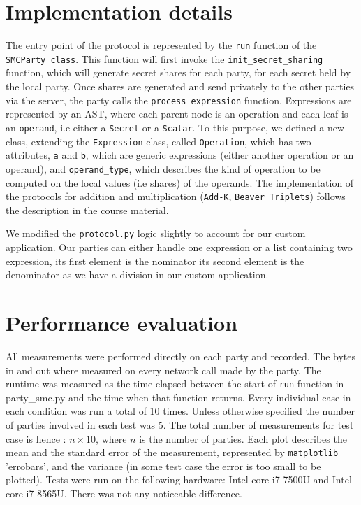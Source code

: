 \documentclass[10pt,conference,compsocconf]{IEEEtran}
\begin{document}
\section{Implementation details}
The entry point of the protocol is represented by the \texttt{run} function of the \texttt{SMCParty class}.
This function will first invoke the \texttt{init\_secret\_sharing} function, which will generate secret shares for each party, for each secret held by the local party.
Once shares are generated and send privately to the other parties via the server, the party calls the \texttt{process\_expression} function.
Expressions are represented by an AST, where each parent node is an operation and each leaf is an \texttt{operand}, i.e either a \texttt{Secret} or a \texttt{Scalar}.
To this purpose, we defined a new class, extending the \texttt{Expression} class, called \texttt{Operation}, which has two attributes, \texttt{a} and \texttt{b},
which are generic expressions (either another operation or an operand), and \texttt{operand\_type}, which describes the kind of operation to be computed on the local values (i.e shares)
of the operands.
The implementation of the protocols for addition and multiplication (\texttt{Add-K}, \texttt{Beaver Triplets}) follows the description in the course material.

We modified the \texttt{protocol.py} logic slightly to account for our custom application.
Our parties can either handle one expression or a list containing two expression, its first element is the nominator
its second element is the denominator as we have a division in our custom application.

\section{Performance evaluation}
All measurements were performed directly on each party and recorded.
The bytes in and out where measured on every
network call made by the party.
The runtime was measured as the time elapsed between the start of \texttt{run} function in
party\_smc.py and the time when that function returns.
Every individual case in each condition was run a total of 10 times.
Unless otherwise specified the number of parties involved in each test was 5.
The total number of measurements for test case is hence : $n \times 10$, where $n$ is the number of parties.
Each plot describes the mean and the standard error of the measurement, represented by \texttt{matplotlib} 'errobars', and the variance (in some test case the error is too small to be plotted).
Tests were run on the following hardware: Intel core i7-7500U and Intel core i7-8565U. There was not any noticeable difference.
\end{document}
